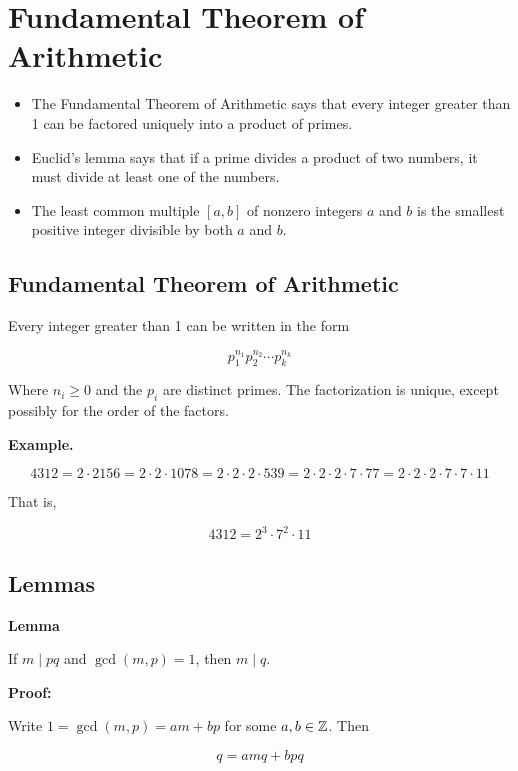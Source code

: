 \newpage
\section{Fundamental Theorem of Arithmetic}

\begin{itemize}
	\item The Fundamental Theorem of Arithmetic says that every integer greater than 1 can be factored uniquely into a product of primes.
	\item Euclid’s lemma says that if a prime divides a product of two numbers, it must divide at least one of the numbers.
	\item The least common multiple \([a, b]\) of nonzero integers \(a\) and \(b\) is the smallest positive integer divisible by both \(a\) and \(b\).
\end{itemize}

\subsection{Fundamental Theorem of Arithmetic}

Every integer greater than 1 can be written in the form

\[
	p_1^{n_1}p_2^{n_2} \cdots p_k^{n_k}
\]

Where \(n_i \geq 0\) and the \(p_i\) are distinct primes. The factorization is unique, except possibly for the order of the factors.
\vspace{\baselineskip}

\textbf{Example.}

\[
	4312 = 2 \cdot 2156 = 2 \cdot 2 \cdot 1078 = 2 \cdot 2 \cdot 2 \cdot 539 = 2 \cdot 2 \cdot 2 \cdot 7 \cdot 77 = 2 \cdot 2 \cdot 2 \cdot 7 \cdot 7 \cdot 11
\]

That is,

\[
	4312 = 2^3 \cdot 7^2 \cdot 11
\]

\subsection{Lemmas}

\textbf{Lemma} 

If \(m \mid pq\) and \(\gcd(m, p) = 1\), then \(m \mid q\).
\vspace{\baselineskip}

\textbf{Proof:} 

Write \(1 = \gcd(m, p) = am + bp\) for some \(a, b \in \mathbb{Z}\). Then

\[
	q = amq + bpq
\]

